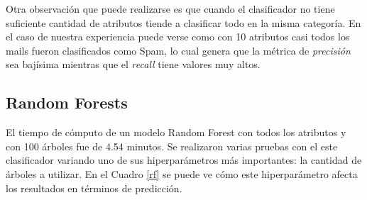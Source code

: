 \documentclass[10pt,a4paper]{article}
\begin{document}
Otra observación que puede realizarse es que cuando el clasificador no tiene suficiente cantidad de atributos tiende a clasificar todo en la misma categoría. En el caso de nuestra experiencia puede verse como con 10 atributos casi todos los mails fueron clasificados como Spam, lo cual genera que la métrica de \textit{precisión} sea bajísima mientras que el \textit{recall} tiene valores muy altos.


\subsection{Random Forests}

El tiempo de cómputo de un modelo Random Forest con todos los atributos y con 100 árboles fue de 4.54 minutos. Se realizaron varias pruebas con el este clasificador variando uno de sus hiperparámetros más importantes: la cantidad de árboles a utilizar. En el Cuadro \ref{rf} se puede ve cómo este hiperparámetro afecta los resultados en términos de predicción.
\end{document}
